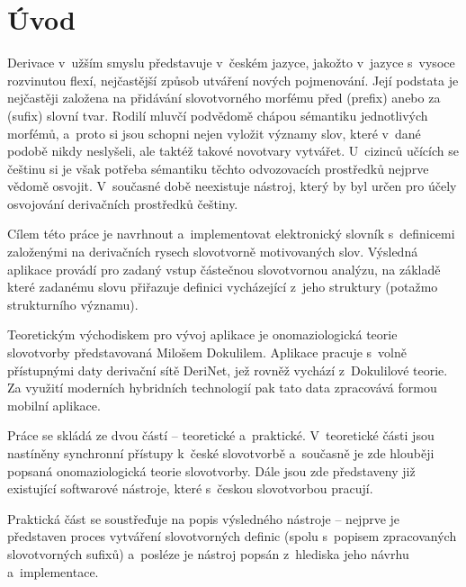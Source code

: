 \hypertarget{uxfavod}{%
\chapter*{Úvod}\label{uvod}\n{}}

Derivace v~užším smyslu představuje v~českém jazyce, jakožto v~jazyce
s~vysoce rozvinutou flexí, nejčastější způsob utváření nových pojmenování.
Její podstata je nejčastěji založena na přidávání slovotvorného morfému
před (prefix) anebo za (sufix) slovní tvar. Rodilí mluvčí podvědomě
chápou sémantiku jednotlivých morfémů, a~proto si jsou schopni nejen
vyložit významy slov, které v~dané podobě nikdy neslyšeli, ale taktéž
takové novotvary vytvářet. U~cizinců učících se češtinu si je však
potřeba sémantiku těchto odvozovacích prostředků nejprve vědomě osvojit.
V~současné době neexistuje nástroj, který by byl určen pro účely
osvojování derivačních prostředků češtiny.

Cílem této práce je navrhnout a~implementovat elektronický slovník
s~definicemi založenými na derivačních rysech slovotvorně motivovaných
slov. Výsledná aplikace provádí pro zadaný vstup částečnou slovotvornou
analýzu, na základě které zadanému slovu přiřazuje definici vycházející
z~jeho struktury (potažmo strukturního významu).

Teoretickým východiskem pro vývoj aplikace je onomaziologická teorie
slovotvorby představovaná Milošem Dokulilem. Aplikace pracuje s~volně
přístupnými daty derivační sítě DeriNet, jež rovněž vychází z~Dokulilové
teorie. Za využití moderních hybridních technologií pak tato data
zpracovává formou mobilní aplikace.

Práce se skládá ze dvou částí -- teoretické a~praktické. V~teoretické
části jsou nastíněny synchronní přístupy k~české slovotvorbě a~současně
je zde hlouběji popsaná onomaziologická teorie slovotvorby. Dále jsou
zde představeny již existující softwarové nástroje, které s~českou
slovotvorbou pracují.

Praktická část se soustřeďuje na popis výsledného nástroje -- nejprve je
představen proces vytváření slovotvorných definic (spolu s~popisem
zpracovaných slovotvorných sufixů) a~posléze je nástroj popsán
z~hlediska jeho návrhu a~implementace.
